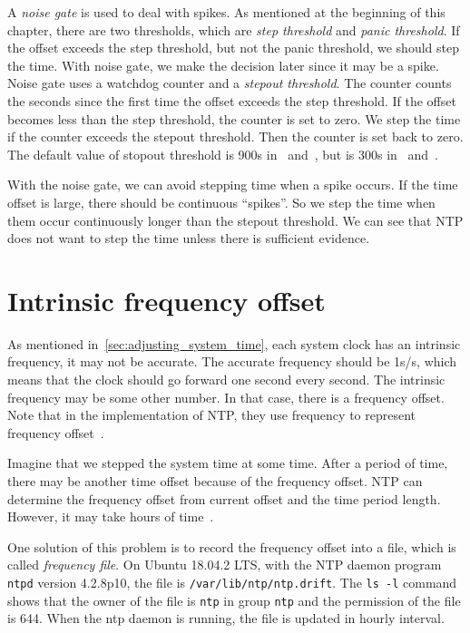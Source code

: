 A \emph{noise gate} is used to deal with spikes. As mentioned at the beginning 
of this chapter, there are two thresholds, which are \emph{step threshold} and 
\emph{panic threshold}. If the offset exceeds the step threshold, but not the
panic threshold, we should step the time. With noise gate, we make the decision
later since it may be a spike. Noise gate uses a watchdog counter and a
\emph{stepout threshold}. The counter counts the seconds since the first time
the offset exceeds the step threshold. If the offset becomes less than the step
threshold, the counter is set to zero. We step the time if the counter exceeds
the stepout threshold. Then the counter is set back to zero. The default value
of stopout threshold is 900s in~\cite{redbook} and~\cite{rfc5905}, but is 300s
in~\cite{source_code} and~\cite{clock_state_machine}. 

With the noise gate, we can avoid stepping time when a spike occurs. If the
time offset is large, there should be continuous ``spikes''. So we step the
time when them occur continuously longer than the stepout threshold. We can see
that NTP does not want to step the time unless there is sufficient evidence.

\section{Intrinsic frequency offset}%
\label{sec:intrinsic_frequency_offset}
As mentioned in~\ref{sec:adjusting_system_time}, each system clock has an
intrinsic frequency, it may not be accurate. The accurate frequency should be
1s/s, which means that the clock should go forward one second every second. The
intrinsic frequency may be some other number. In that case, there is a
frequency offset. Note that in the implementation of NTP\null, they use
frequency to represent frequency offset~\cite{source_code}. 

Imagine that we stepped the system time at some time. After a period of time,
there may be another time offset because of the frequency offset. NTP can
determine the frequency offset from current offset and the time period length.
However, it may take hours of time~\cite{redbook}. 

One solution of this problem is to record the frequency offset into a file,
which is called \emph{frequency file}. On Ubuntu 18.04.2 LTS, with the NTP
daemon program \verb|ntpd| version 4.2.8p10, the file is
\verb|/var/lib/ntp/ntp.drift|. The \verb|ls -l| command shows that the owner of
the file is \verb|ntp| in group \verb|ntp| and the permission of the file is
644. When the ntp daemon is running, the file is updated in hourly interval.

